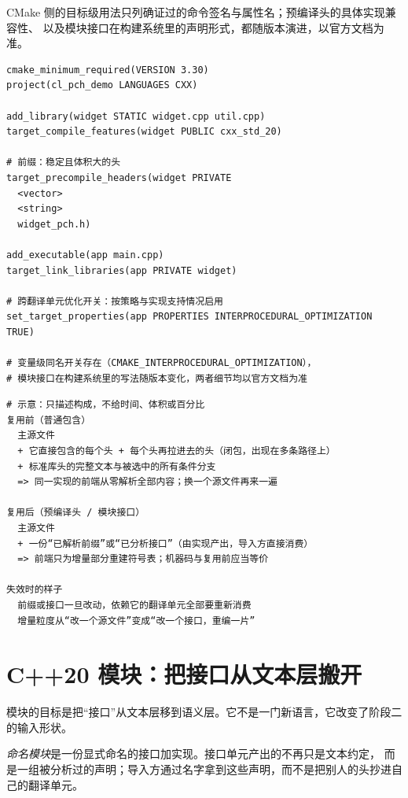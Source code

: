 \documentclass[12pt,a4paper,fontset=fandol]{ctexbook}
\newcommand{\cpp}[1]{C++#1}
\begin{document}
CMake 侧的目标级用法只列确证过的命令签名与属性名；预编译头的具体实现兼容性、
以及模块接口在构建系统里的声明形式，都随版本演进，以官方文档为准。

\begin{lstlisting}[style=cmakestyle,language=CMakeCL,caption={目标级用法：预编译头与全局优化提示}]
cmake_minimum_required(VERSION 3.30)
project(cl_pch_demo LANGUAGES CXX)

add_library(widget STATIC widget.cpp util.cpp)
target_compile_features(widget PUBLIC cxx_std_20)

# 前缀：稳定且体积大的头
target_precompile_headers(widget PRIVATE
  <vector>
  <string>
  widget_pch.h)

add_executable(app main.cpp)
target_link_libraries(app PRIVATE widget)

# 跨翻译单元优化开关：按策略与实现支持情况启用
set_target_properties(app PROPERTIES INTERPROCEDURAL_OPTIMIZATION TRUE)

# 变量级同名开关存在（CMAKE_INTERPROCEDURAL_OPTIMIZATION），
# 模块接口在构建系统里的写法随版本变化，两者细节均以官方文档为准
\end{lstlisting}

\begin{lstlisting}[style=outstyle,caption={接口被复用前后，“翻译单元”构成的变化（示意描述，不含实测数据）}]
# 示意：只描述构成，不给时间、体积或百分比
复用前（普通包含）
  主源文件
  + 它直接包含的每个头 + 每个头再拉进去的头（闭包，出现在多条路径上）
  + 标准库头的完整文本与被选中的所有条件分支
  => 同一实现的前端从零解析全部内容；换一个源文件再来一遍

复用后（预编译头 / 模块接口）
  主源文件
  + 一份“已解析前缀”或“已分析接口”（由实现产出，导入方直接消费）
  => 前端只为增量部分重建符号表；机器码与复用前应当等价

失效时的样子
  前缀或接口一旦改动，依赖它的翻译单元全部要重新消费
  增量粒度从“改一个源文件”变成“改一个接口，重编一片”
\end{lstlisting}

\section{\cpp{20} 模块：把接口从文本层搬开}\label{sec:cl02-modules}

模块的目标是把“接口”从文本层移到语义层。它不是一门新语言，它改变了阶段二的输入形状。

\emph{命名模块}是一份显式命名的接口加实现。接口单元产出的不再只是文本约定，
而是一组被分析过的声明；导入方通过名字拿到这些声明，而不是把别人的头抄进自己的翻译单元。
\end{document}
